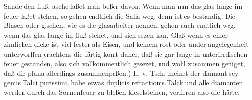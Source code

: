 Sande den fluß, asche laßet man beßer davon. Wenn man nun das glas\protect{} lange im feuer\protect{} laßet stehen, so gehen endtlich die Salia\protect{} weg, denn ist es bestandig. \pend \pstart  Die Blasen oder gischen, wie es die glasarbeiter nennen, gehen auch endtlich weg, wenn das glas\protect{} lange im fluß stehet, und sich sezen kan. \pend \pstart Glaß\protect{} wenn es einer zimlichen dicke ist viel fester als Eisen\protect{}, und keinem rost oder ander angelegenheit unterworffen  erachtens die f\"{a}rtig komt daher, daß sie gar lange in unterirrdischen feuer\protect{} gestanden, also sich vollkommentlich gesezet, und  wohl zusammen gef\"{u}get, daß die plana allerdings zusammenpaßen.) H. v. Tsch.\protect{} meinet der diamant sey genus Talci\protect{} purissimi, habe etwas duplicis refractionis\protect{}.\pend \pstart Talck\protect{} und alle diamanten werden durch das Sonnenfeuer zu bloßen kieselsteinen, verlieren also die h\"{a}rte.